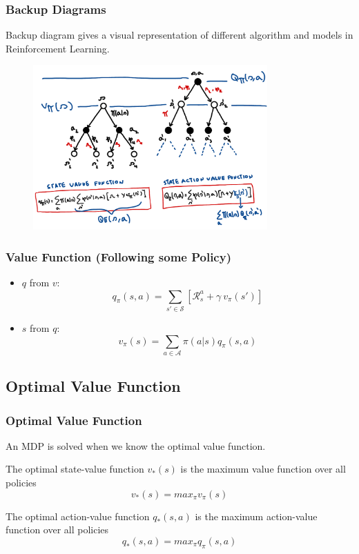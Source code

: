 \begin{frame}
    \frametitle{Backup Diagrams}
    \centering
    Backup diagram gives a visual representation of different algorithm and models in Reinforcement Learning.
    \begin{figure}
        \centering
        \includegraphics[width=0.8\textwidth]{sections/markov/figures/backup_diagram.pdf}
    \end{figure}
\end{frame}


\begin{frame}
    \frametitle{Value Function (Following some Policy)}
    \begin{itemize}
        \item $q$ from $v$:
        $$q_{\pi}(s,a) = \sum_{s'\in\mathcal{S}}[\mathcal{R}_{s}^{a}+\gamma~v_{\pi}(s')]$$
        \item $s$ from $q$:
        $$v_{\pi}(s) = \sum_{a\in\mathcal{A}}\pi(a|s)q_{\pi}(s,a)$$
    \end{itemize}
\end{frame}


\subsection{Optimal Value Function}


\begin{frame}
    \frametitle{Optimal Value Function}
    \centering
    An MDP is solved when we know the optimal value function.
    \begin{definition}
        The optimal state-value function $v_{*}(s)$ is the maximum value
        function over all policies
        $$v_{*}(s) = max_{\pi}v_{\pi}(s)$$

        The optimal action-value function $q_{*}(s,a)$ is the maximum
        action-value function over all policies
        $$q_{*}(s,a) = max_{\pi}q_{\pi}(s,a)$$
    \end{definition}
\end{frame}

